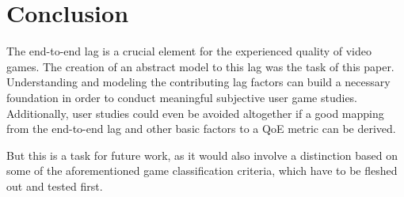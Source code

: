 \section{Conclusion}
\label{sec:conclusion}

The end-to-end lag is a crucial element for the experienced quality of video games. The creation of an abstract model to this lag was the task of this paper. Understanding and modeling the contributing lag factors can build a necessary foundation in order to conduct meaningful subjective user game studies. Additionally, user studies could even be avoided altogether if a good mapping from the end-to-end lag and other basic factors to a \gls{QoE} metric can be derived. 

But this is a task for future work, as it would also involve a distinction based on some of the aforementioned game classification criteria, which have to be fleshed out and tested first.